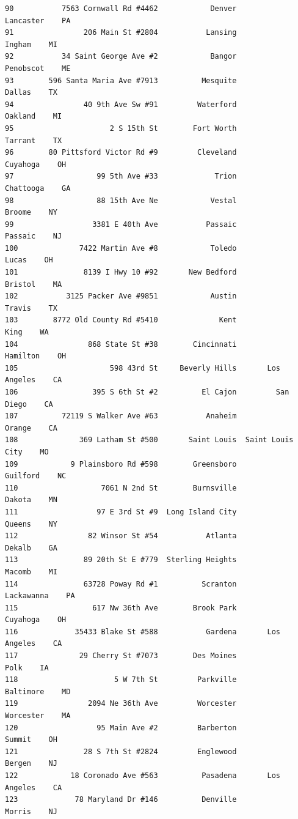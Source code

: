 \documentclass[
  12pt,
]{article}
\begin{document}
\begin{verbatim}
90           7563 Cornwall Rd #4462            Denver         Lancaster    PA
91                206 Main St #2804           Lansing            Ingham    MI
92           34 Saint George Ave #2            Bangor         Penobscot    ME
93        596 Santa Maria Ave #7913          Mesquite            Dallas    TX
94                40 9th Ave Sw #91         Waterford           Oakland    MI
95                      2 S 15th St        Fort Worth           Tarrant    TX
96        80 Pittsford Victor Rd #9         Cleveland          Cuyahoga    OH
97                   99 5th Ave #33             Trion         Chattooga    GA
98                   88 15th Ave Ne            Vestal            Broome    NY
99                  3381 E 40th Ave           Passaic           Passaic    NJ
100              7422 Martin Ave #8            Toledo             Lucas    OH
101               8139 I Hwy 10 #92       New Bedford           Bristol    MA
102           3125 Packer Ave #9851            Austin            Travis    TX
103        8772 Old County Rd #5410              Kent              King    WA
104                868 State St #38        Cincinnati          Hamilton    OH
105                     598 43rd St     Beverly Hills       Los Angeles    CA
106                 395 S 6th St #2          El Cajon         San Diego    CA
107          72119 S Walker Ave #63           Anaheim            Orange    CA
108              369 Latham St #500       Saint Louis  Saint Louis City    MO
109            9 Plainsboro Rd #598        Greensboro          Guilford    NC
110                   7061 N 2nd St        Burnsville            Dakota    MN
111                  97 E 3rd St #9  Long Island City            Queens    NY
112                82 Winsor St #54           Atlanta            Dekalb    GA
113               89 20th St E #779  Sterling Heights            Macomb    MI
114               63728 Poway Rd #1          Scranton        Lackawanna    PA
115                 617 Nw 36th Ave        Brook Park          Cuyahoga    OH
116             35433 Blake St #588           Gardena       Los Angeles    CA
117              29 Cherry St #7073        Des Moines              Polk    IA
118                      5 W 7th St         Parkville         Baltimore    MD
119                2094 Ne 36th Ave         Worcester         Worcester    MA
120                  95 Main Ave #2         Barberton            Summit    OH
121               28 S 7th St #2824         Englewood            Bergen    NJ
122            18 Coronado Ave #563          Pasadena       Los Angeles    CA
123             78 Maryland Dr #146          Denville            Morris    NJ

\end{verbatim}
\end{document}
